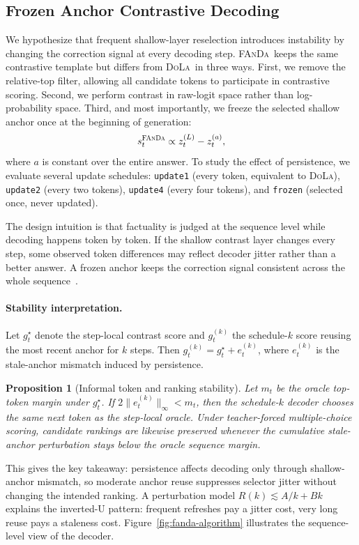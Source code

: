 \documentclass[10pt,twocolumn,letterpaper]{article}
\newcommand{\fanda}{\textsc{FAnDa}}
\newcommand{\dola}{\textsc{DoLa}}
\newtheorem{proposition}{Proposition}
\begin{document}
\subsection{Frozen Anchor Contrastive Decoding}
We hypothesize that frequent shallow-layer reselection introduces instability by changing the correction signal at every decoding step. \fanda\ keeps the same contrastive template but differs from \dola\ in three ways. First, we remove the relative-top filter, allowing all candidate tokens to participate in contrastive scoring. Second, we perform contrast in raw-logit space rather than log-probability space. Third, and most importantly, we freeze the selected shallow anchor once at the beginning of generation:
\[
s_t^{\text{\fanda}} \propto z_t^{(L)} - z_t^{(a)},
\]
where $a$ is constant over the entire answer. To study the effect of persistence, we evaluate several update schedules: \texttt{update1} (every token, equivalent to \dola), \texttt{update2} (every two tokens), \texttt{update4} (every four tokens), and \texttt{frozen} (selected once, never updated).

The design intuition is that factuality is judged at the sequence level while decoding happens token by token. If the shallow contrast layer changes every step, some observed token differences may reflect decoder jitter rather than a better answer. A frozen anchor keeps the correction signal consistent across the whole sequence~\cite{attention,qwen25}.

\paragraph{Stability interpretation.}
Let $g_t^\star$ denote the step-local contrast score and $g_t^{(k)}$ the schedule-$k$ score reusing the most recent anchor for $k$ steps. Then $g_t^{(k)} = g_t^\star + e_t^{(k)}$, where $e_t^{(k)}$ is the stale-anchor mismatch induced by persistence.

\begin{proposition}[Informal token and ranking stability]
Let $m_t$ be the oracle top-token margin under $g_t^\star$. If $2\|e_t^{(k)}\|_\infty < m_t$, then the schedule-$k$ decoder chooses the same next token as the step-local oracle. Under teacher-forced multiple-choice scoring, candidate rankings are likewise preserved whenever the cumulative stale-anchor perturbation stays below the oracle sequence margin.
\end{proposition}

This gives the key takeaway: persistence affects decoding only through shallow-anchor mismatch, so moderate anchor reuse suppresses selector jitter without changing the intended ranking. A perturbation model $R(k) \lesssim A/k + Bk$ explains the inverted-U pattern: frequent refreshes pay a jitter cost, very long reuse pays a staleness cost. Figure~\ref{fig:fanda-algorithm} illustrates the sequence-level view of the decoder.
\end{document}
